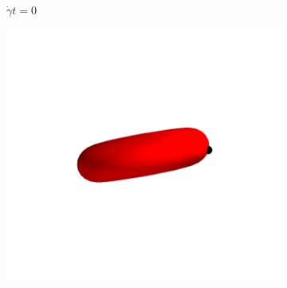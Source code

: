 \begin{figure}[tb]
    \centering
    \begin{subfigure}{\textwidth}
    \begin{minipage}{0.2\textwidth}
        \centering
        \\
        $\dot{\gamma}t = 0$
    \end{minipage}%
    \begin{minipage}{0.2\textwidth}
        \centering
        \includegraphics[trim=75 100 75 100, clip, width=\textwidth]{figures/tumble1000.png}\\

\end{minipage}
\end{subfigure}
\end{figure}
